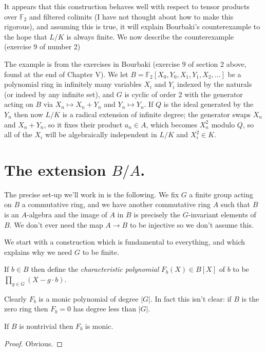 It appears that this construction behaves well with respect to tensor
products over $\mathbb{F}_2$ and filtered colimits (I have not thought about
how to make this rigorous), and assuming this is true, it will explain Bourbaki's
counterexample to the hope that $L/K$ is always finite. We now describe the counterexample
(exercise 9 of number 2)

The example is from the exercises in Bourbaki (exercise 9 of section 2 above, found at the end
of Chapter V). We let $B=\mathbb{F}_2[X_0,Y_0,X_1,Y_1,X_2,\ldots]$
be a polynomial ring in infinitely many variables $X_i$ and $Y_i$ indexed by the
naturals (or indeed by any infinite set), and $G$ is cyclic of order 2 with
the generator acting on $B$ via $X_n\mapsto X_n+Y_n$ and $Y_n\mapsto Y_n$.
If $Q$ is the ideal generated by the $Y_n$ then now $L/K$ is a radical extension of
infinite degree; the generator swaps $X_n$ and $X_n+Y_n$, so it fixes
their product $a_n\in A$, which becomes $X_n^2$ modulo $Q$, so all
of the $X_{i}$ will be algebraically independent in $L/K$ and $X_{i}^2\in K$.

\section{The extension \texorpdfstring{$B/A$}{B/A}.}

The precise set-up we'll work in is the following. We fix $G$ a finite group acting
on $B$ a commutative ring, and we have another commutative ring $A$ such
that $B$ is an $A$-algebra and the image of $A$ in $B$ is precisely the $G$-invariant
elements of $B$. We don't ever need the map $A\to B$ to be injective so we don't assume this.

We start with a construction which is fundamental to everything,
and which explains why we need $G$ to be finite.

\begin{definition}
  \label{MulSemiringAction.CharacteristicPolynomial.F}
  \leanok
  If $b\in B$ then define the \emph{characteristic polynomial}
  $F_b(X) \in B[X]$ of $b$ to be $\prod_{g\in G}(X-g\cdot b)$.
\end{definition}

Clearly $F_b$ is a monic polynomial of degree $|G|$. In fact this isn't clear:
if $B$ is the zero ring then $F_b=0$ has degree less than $|G|$.

\begin{lemma}
  \label{MulSemiringAction.CharacteristicPolynomial.F_degree}
  \leanok
  If $B$ is nontrivial then $F_b$ is monic.
\end{lemma}
\begin{proof}
  \leanok
  Obvious.
\end{proof}

